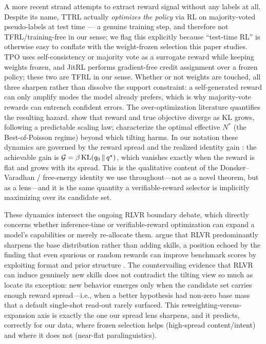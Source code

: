 A more recent strand attempts to extract reward signal without any labels at all. Despite its name, TTRL \citep{zuo2025ttrl} actually \emph{optimizes the policy} via RL on majority-voted pseudo-labels at test time --- a genuine training step, and therefore not TFRL/training-free in our sense; we flag this explicitly because ``test-time RL'' is otherwise easy to conflate with the weight-frozen selection this paper studies. TPO \citep{li2025tpo} uses self-consistency or majority vote as a surrogate reward while keeping weights frozen, and JitRL \citep{jitrl2026} performs gradient-free credit assignment over a frozen policy; these two are TFRL in our sense. Whether or not weights are touched, all three sharpen rather than dissolve the support constraint: a self-generated reward can only amplify modes the model already prefers, which is why majority-vote rewards can entrench confident errors. The over-optimization literature quantifies the resulting hazard. \citet{gao2023overopt} show that reward and true objective diverge as KL grows, following a predictable scaling law; \citet{khalaf2025hedgetune} characterize the optimal effective $N^\ast$ (the Best-of-Poisson regime) beyond which tilting harms. In our notation these dynamics are governed by the reward spread \spread and the realized identity gain \gain: the achievable gain is \(\mathcal{G}=\beta\,\mathrm{KL}\!\left(q_{0} \,\|\, q^{\star}\right)\), which vanishes exactly when the reward is flat and grows with its spread. This is the qualitative content of the Donsker--Varadhan / free-energy identity we use throughout---not as a novel theorem, but as a lens---and it is the same quantity a verifiable-reward selector is implicitly maximizing over its candidate set.

These dynamics intersect the ongoing RLVR boundary debate, which directly concerns whether inference-time or verifiable-reward optimization can expand a model's capabilities or merely re-allocate them. \citet{rlvrincentive2025} argue that RLVR predominantly sharpens the base distribution rather than adding skills, a position echoed by the finding that even spurious or random rewards can improve benchmark scores by exploiting format and prior structure \citep{spuriousrewards2025}. The countervailing evidence that RLVR can induce genuinely new skills \citep{newskills2026} does not contradict the tilting view so much as locate its exception: new behavior emerges only when the candidate set \cZ carries enough reward spread---i.e., when a better hypothesis had non-zero base mass that a default single-shot read-out rarely surfaced. This reweighting-versus-expansion axis is exactly the one our spread lens sharpens, and it predicts, correctly for our data, where frozen selection helps (high-spread content/intent) and where it does not (near-flat paralinguistics).

